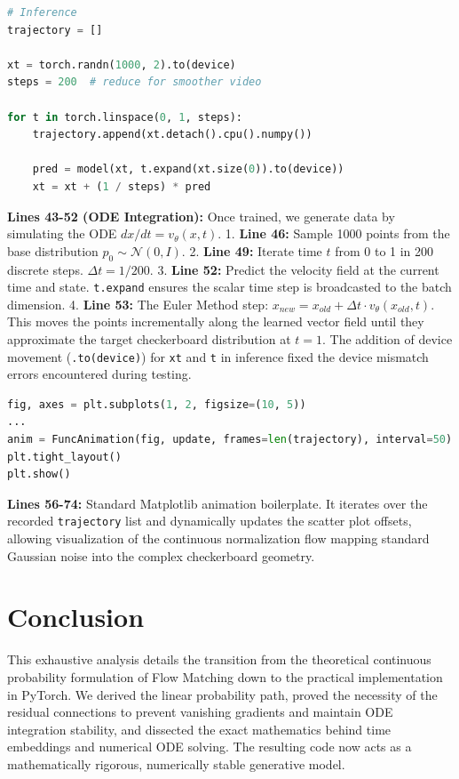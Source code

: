 \documentclass[12pt]{article}
\begin{document}
\begin{lstlisting}[language=Python]
# Inference
trajectory = []

xt = torch.randn(1000, 2).to(device)
steps = 200  # reduce for smoother video

for t in torch.linspace(0, 1, steps):
    trajectory.append(xt.detach().cpu().numpy())

    pred = model(xt, t.expand(xt.size(0)).to(device))
    xt = xt + (1 / steps) * pred
\end{lstlisting}
\textbf{Lines 43-52 (ODE Integration):}
Once trained, we generate data by simulating the ODE $dx/dt = v_\theta(x, t)$.
1. \textbf{Line 46:} Sample 1000 points from the base distribution $p_0 \sim \mathcal{N}(0, I)$.
2. \textbf{Line 49:} Iterate time $t$ from 0 to 1 in 200 discrete steps. $\Delta t = 1/200$.
3. \textbf{Line 52:} Predict the velocity field at the current time and state. \texttt{t.expand} ensures the scalar time step is broadcasted to the batch dimension.
4. \textbf{Line 53:} The Euler Method step: $x_{new} = x_{old} + \Delta t \cdot v_\theta(x_{old}, t)$. 
This moves the points incrementally along the learned vector field until they approximate the target checkerboard distribution at $t=1$. The addition of device movement (\texttt{.to(device)}) for \texttt{xt} and \texttt{t} in inference fixed the device mismatch errors encountered during testing.

\begin{lstlisting}[language=Python]
fig, axes = plt.subplots(1, 2, figsize=(10, 5))
...
anim = FuncAnimation(fig, update, frames=len(trajectory), interval=50)
plt.tight_layout()
plt.show()
\end{lstlisting}
\textbf{Lines 56-74:} Standard Matplotlib animation boilerplate. It iterates over the recorded \texttt{trajectory} list and dynamically updates the scatter plot offsets, allowing visualization of the continuous normalization flow mapping standard Gaussian noise into the complex checkerboard geometry.

\section{Conclusion}
This exhaustive analysis details the transition from the theoretical continuous probability formulation of Flow Matching down to the practical implementation in PyTorch. We derived the linear probability path, proved the necessity of the residual connections to prevent vanishing gradients and maintain ODE integration stability, and dissected the exact mathematics behind time embeddings and numerical ODE solving. The resulting code now acts as a mathematically rigorous, numerically stable generative model.
\end{document}
